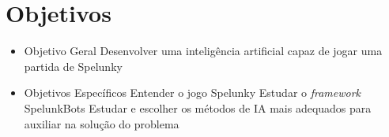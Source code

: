 \chapter{\label{chap:objectives}Objetivos}

\begin{itemize}
    \item Objetivo Geral
        \subitem Desenvolver uma inteligência artificial capaz de jogar uma partida de Spelunky
    \item Objetivos Específicos
        \subitem Entender o jogo Spelunky
        \subitem Estudar o \textit{framework} SpelunkBots
        \subitem Estudar e escolher os métodos de IA mais adequados para auxiliar na solução do problema
\end{itemize}
